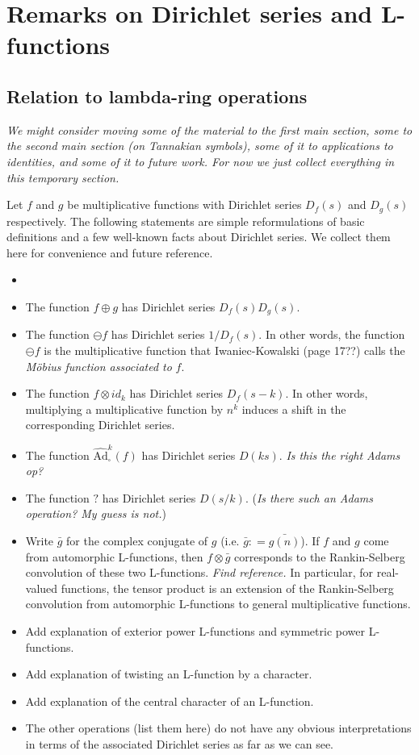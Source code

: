\documentclass[a4paper]{article}
\theoremstyle{definition}
\theoremstyle{remark}
\newcommand{\hatboxadam}[1]{\widehat{\text{Ad}}^{#1}_{\square}}
\begin{document}
\section{Remarks on Dirichlet series and L-functions}

\subsection{Relation to lambda-ring operations}

\emph{We might consider moving some of the material to the first main section, some to the second main section (on Tannakian symbols), some of it to applications to identities, and some of it to future work. For now we just collect everything in this temporary section.}

Let $f$ and $g$ be multiplicative functions with Dirichlet series $D_f(s)$ and $D_g(s)$ respectively. The following statements are simple reformulations of basic definitions and a few well-known facts about Dirichlet series. We collect them here for convenience and future reference.
\begin{itemize}
\item {}
\item The function $f \oplus g$ has Dirichlet series $D_f(s) D_g(s)$.
\item The function $\ominus f$ has Dirichlet series $1/D_f(s)$. In other words, the function $\ominus f$ is the multiplicative function that Iwaniec-Kowalski (page 17??) calls the \emph{M{\"o}bius function associated to} $f$.
\item The function $f \otimes id_{k}$ has Dirichlet series $D_f(s-k)$. In other words, multiplying a multiplicative function by $n^k$ induces a shift in the corresponding Dirichlet series.
\item The function $\hatboxadam{k}(f)$ has Dirichlet series $D(ks)$. \emph{Is this the right Adams op?}
\item The function $?$ has Dirichlet series $D(s/k)$. (\emph{Is there such an Adams operation? My guess is not.})
\item Write $\bar{g}$ for the complex conjugate of $g$ (i.e. $\bar{g} : = \bar{g(n)} $). If $f$ and $g$ come from automorphic L-functions, then $f \otimes \bar{g}$ corresponds to the Rankin-Selberg convolution of these two L-functions. \emph{Find reference.} In particular, for real-valued functions, the tensor product is an extension of the Rankin-Selberg convolution from automorphic L-functions to general multiplicative functions.
\item Add explanation of exterior power L-functions and symmetric power L-functions.
\item Add explanation of twisting an L-function by a character.
\item Add explanation of the central character of an L-function.
\item The other operations (list them here) do not have any obvious interpretations in terms of the associated Dirichlet series as far as we can see.
\end{itemize}
\end{document}
